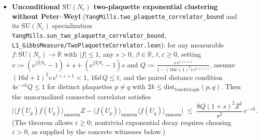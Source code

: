 \documentclass[11pt]{article}
\newcommand{\R}{\mathbb{R}}
\begin{document}
\begin{itemize}
  \item \textbf{Unconditional $\mathrm{SU}(N_c)$ two-plaquette exponential clustering without Peter--Weyl}
  (\nolinkurl{YangMills.two_plaquette_correlator_bound} and its $\mathrm{SU}(N_c)$
  specialization \nolinkurl{YangMills.sun_two_plaquette_correlator_bound},
  \texttt{L1\_GibbsMeasure/TwoPlaquetteCorrelator.lean}): for any measurable
  $f : \mathrm{SU}(N_c) \to \R$ with $|f| \le 1$, any $s > 0$, $\beta \in \R$,
  $t, \varepsilon \ge 0$, setting $v := (e^{|\beta| N_c} - 1) + s + (e^{|\beta| N_c} - 1)s$
  and $Q := \frac{v\, e^{t+\varepsilon+1}}{1 - (16d+1)^2 v\, e^{t+\varepsilon+1}}$, assume
  $(16d+1)^2 v\, e^{t+\varepsilon+1} < 1$, $16d\, Q \le t$, and the paired distance condition
  $4 e^{-\varepsilon k} Q \le 1$ for distinct plaquettes $p \neq q$ with
  $2k \le \mathrm{dist}_{\mathrm{touchGraph}}(p,q)$. Then the unnormalized connected
  correlator satisfies
  \[
    \bigl|\langle f(U_p)f(U_q)\rangle_{\mathrm{unnorm}} Z - \langle f(U_p)\rangle_{\mathrm{unnorm}}\langle f(U_q)\rangle_{\mathrm{unnorm}}\bigr|
    \;\le\; \frac{8 Q (1+s)^2 Z^2}{s^2}\, e^{-\varepsilon k}.
  \]
  (The theorem allows $\varepsilon \ge 0$; nontrivial exponential decay requires choosing
  $\varepsilon > 0$, as supplied by the concrete witnesses below.)


\end{itemize}
\end{document}
